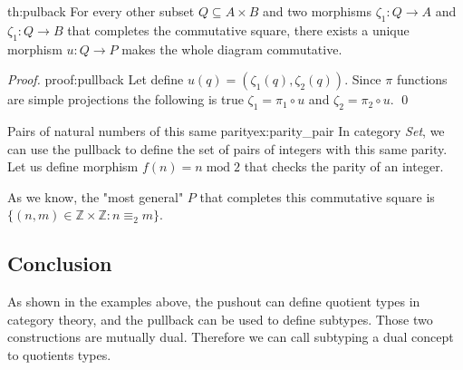\begin{theo}{}{th:pulback}
For every other subset $Q \subseteq A \times B$ and two morphisms $\zeta_1: Q \rightarrow A$ and $\zeta_1: Q \rightarrow B$ that completes the commutative square, there exists a unique morphism $u: Q \rightarrow P$ makes the whole diagram commutative.
\end{theo}
\begin{proof}{}{proof:pullback}
Let define $u(q) = (\zeta_1(q), \zeta_2(q))$. Since $\pi$ functions are simple projections the following is true $\zeta_1 = \pi_1 \circ u$ and $\zeta_2 = \pi_2 \circ u$. \qed
\end{proof}
\begin{example}{Pairs of natural numbers of this same parity}{ex:parity_pair}
In category \emph{Set}, we can use the pullback to define the set of pairs of integers with this same parity. Let us define morphism $f(n) = n \; \textrm{mod} \; 2$ that checks the parity of an integer.
\begin{center}
\end{center}
As we know, the "most general" $P$ that completes this commutative square is $\{(n, m) \in \mathbb{Z} \times \mathbb{Z} : n \equiv_2 m\}$.
\end{example}
\subsection{Conclusion}
As shown in the examples above, the pushout can define quotient types in category theory, and the pullback can be used to define subtypes.  Those two constructions are mutually dual. Therefore we can call subtyping a dual concept to quotients types.
